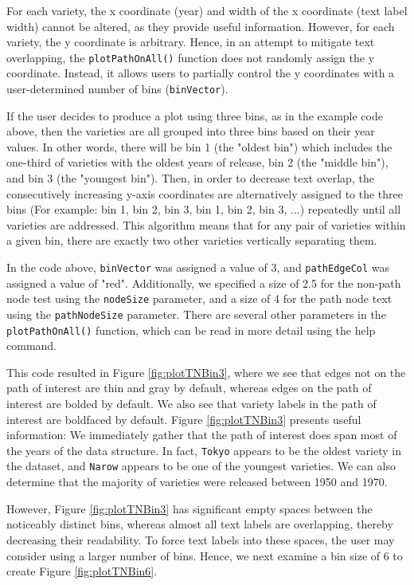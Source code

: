 \documentclass[11pt,a4paper,oldfontcommands,openany]{memoir}
\numberwithin{equation}{section} %
\newcommand{\code}[1]{{\texttt{#1}}}
\begin{document}
For each variety, the x coordinate (year) and width of the x coordinate (text label width) cannot be altered, as they provide useful information. However, for each variety, the y coordinate is arbitrary. Hence, in an attempt to mitigate text overlapping, the \code{plotPathOnAll()} function does not randomly assign the y coordinate. Instead, it allows users to partially control the y coordinates with a user-determined number of bins (\code{binVector}).

If the user decides to produce a plot using three bins, as in the example code above, then the varieties are all grouped into three bins based on their year values. In other words, there will be bin 1 (the "oldest bin") which includes the one-third of varieties with the oldest years of release, bin 2 (the "middle bin"), and bin 3 (the "youngest bin"). Then, in order to decrease text overlap, the consecutively increasing y-axis coordinates are alternatively assigned to the three bins (For example: bin 1, bin 2, bin 3, bin 1, bin 2, bin 3, ...) repeatedly until all varieties are addressed. This algorithm means that for any pair of varieties within a given bin, there are exactly two other varieties vertically separating them.

In the code above, \code{binVector} was assigned a value of 3, and \code{pathEdgeCol} was assigned a value of "red". Additionally, we specified a size of 2.5 for the non-path node test using the \code{nodeSize} parameter, and a size of 4 for the path node text using the \code{pathNodeSize} parameter. There are several other parameters in the \code{plotPathOnAll()} function, which can be read in more detail using the help command.

This code resulted in Figure \ref{fig:plotTNBin3}, where we see that edges not on the path of interest are thin and gray by default, whereas edges on the path of interest are bolded by default. We also see that variety labels in the path of interest are boldfaced by default. Figure \ref{fig:plotTNBin3} presents useful information: We immediately gather that the path of interest does span most of the years of the data structure. In fact, \code{Tokyo} appears to be the oldest variety in the dataset, and \code{Narow} appears to be one of the youngest varieties. We can also determine that the majority of varieties were released between 1950 and 1970.

However, Figure \ref{fig:plotTNBin3} has significant empty spaces between the noticeably distinct bins, whereas almost all text labels are overlapping, thereby decreasing their readability. To force text labels into these spaces, the user may consider using a larger number of bins. Hence, we next examine a bin size of 6 to create Figure \ref{fig:plotTNBin6}.
\end{document}
